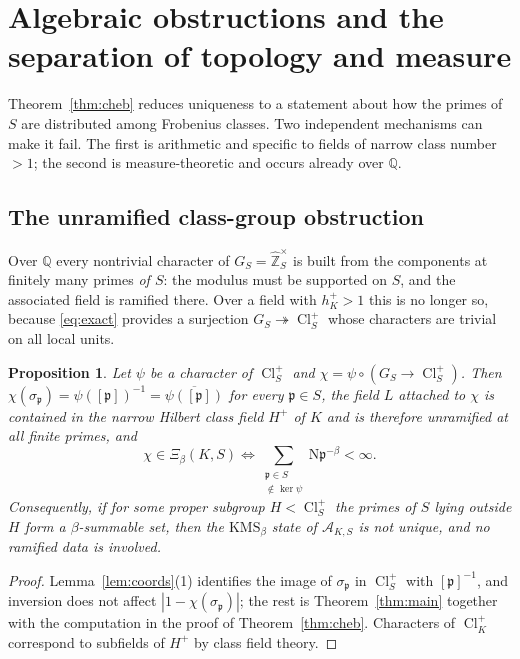 \documentclass[11pt]{amsart}
\numberwithin{equation}{section}
\newtheorem{proposition}[theorem]{Proposition}
\theoremstyle{definition}
\theoremstyle{remark}
\newcommand{\Z}{\mathbb{Z}}
\newcommand{\Q}{\mathbb{Q}}
\newcommand{\hZ}{\widehat{\Z}}
\newcommand{\Cl}{\operatorname{Cl}}
\newcommand{\Ns}{\mathrm{N}}
\newcommand{\cA}{\mathcal{A}}
\newcommand{\pp}{\mathfrak{p}}
\begin{document}
\section{Algebraic obstructions and the separation of topology and measure}\label{sec:obstructions}

Theorem~\ref{thm:cheb} reduces uniqueness to a statement about how the primes
of $S$ are distributed among Frobenius classes. Two independent mechanisms can
make it fail. The first is arithmetic and specific to fields of narrow class
number $>1$; the second is measure-theoretic and occurs already over $\Q$.

\subsection{The unramified class-group obstruction}\label{sec:classgp}

Over $\Q$ every nontrivial character of $G_S=\hZ_S^\times$ is built from the
components at finitely many primes \emph{of $S$}: the modulus must be supported
on $S$, and the associated field is ramified there. Over a field with
$h^+_K>1$ this is no longer so, because \eqref{eq:exact} provides a surjection
$G_S\twoheadrightarrow\Cl^+_S$ whose characters are trivial on all local units.

\begin{proposition}\label{prop:unram}
Let $\psi$ be a character of $\Cl^+_S$ and $\chi=\psi\circ(G_S\to\Cl^+_S)$. Then
$\chi(\sigma_\pp)=\psi([\pp])^{-1}=\overline{\psi([\pp])}$ for every $\pp\in S$, the field $L$ attached to
$\chi$ is contained in the narrow Hilbert class field $H^+$ of $K$ and is
therefore unramified at all finite primes, and
\[
\chi\in\Xi_\beta(K,S)\iff\sum_{\substack{\pp\in S\\ [\pp]\notin\ker\psi}}\Ns\pp^{-\beta}<\infty .
\]
Consequently, if for some proper subgroup $H<\Cl^+_S$ the primes of $S$ lying
outside $H$ form a $\beta$-summable set, then the $\mathrm{KMS}_\beta$ state of
$\cA_{K,S}$ is not unique, and no ramified data is involved.
\end{proposition}

\begin{proof}
Lemma~\ref{lem:coords}(1) identifies the image of $\sigma_\pp$ in $\Cl^+_S$ with
$[\pp]^{-1}$, and inversion does not affect $|1-\chi(\sigma_\pp)|$; the rest is Theorem~\ref{thm:main} together with the
computation in the proof of Theorem~\ref{thm:cheb}. Characters of $\Cl^+_K$
correspond to subfields of $H^+$ by class field theory.
\end{proof}
\end{document}
